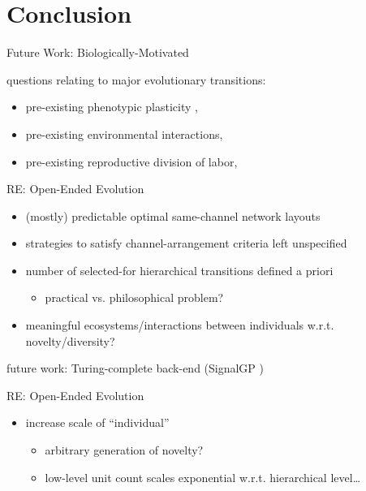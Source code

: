 \section{Conclusion}

\begin{frame}{Future Work: Biologically-Motivated}

questions relating to major evolutionary transitions:
\begin{itemize}
\item  pre-existing phenotypic plasticity \citep{clune2007investigating, lalejini2016evolutionary},
\item pre-existing environmental interactions,
\item pre-existing reproductive division of labor,
\end{itemize}

\end{frame}

\begin{frame}{RE: Open-Ended Evolution}

\begin{itemize}[<+->]
\item (mostly) predictable optimal same-channel network layouts
\item strategies to satisfy channel-arrangement criteria left unspecified
\item number of selected-for hierarchical transitions defined a priori
\begin{itemize}[<+->]
\item practical vs. philosophical problem?
\end{itemize}
\item meaningful ecosystems/interactions between individuals w.r.t. novelty/diversity? \cite{soros2014identifying,dolson2018evolution}
\end{itemize}

\vspace{2ex}

future work: Turing-complete back-end (SignalGP \cite{lalejini2018evolving})

\end{frame}

\begin{frame}{RE: Open-Ended Evolution}

\begin{itemize}[<+->]
\item increase scale of ``individual''
  \begin{itemize}
  \item arbitrary generation of novelty? \cite{banzhaf2015open}
  \item low-level unit count scales exponential w.r.t. hierarchical level\dots
  \end{itemize}
\end{itemize}

\end{frame}

